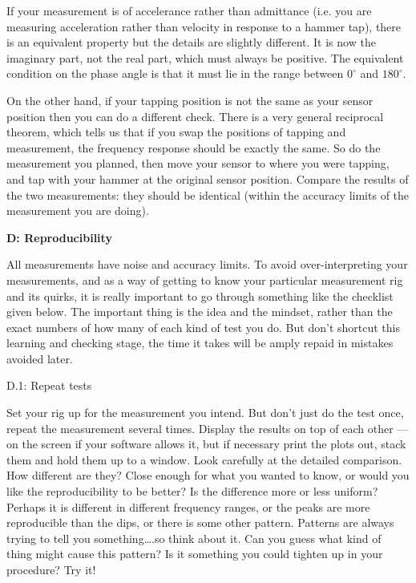   If your measurement is of accelerance rather than admittance (i.e. you are 
  measuring acceleration rather than velocity in response to a hammer tap), 
  there is an equivalent property but the details are slightly different. It is 
  now the imaginary part, not the real part, which must always be positive. The 
  equivalent condition on the phase angle is that it must lie in the range 
  between $0^\circ$ and $180^\circ$. 

  On the other hand, if your tapping position is not the same as your sensor 
  position then you can do a different check. There is a very general 
  reciprocal theorem, which tells us that if you swap the positions of tapping 
  and measurement, the frequency response should be exactly the same. So do the 
  measurement you planned, then move your sensor to where you were tapping, and 
  tap with your hammer at the original sensor position. Compare the results of 
  the two measurements: they should be identical (within the accuracy limits of 
  the measurement you are doing). 

  \textbf{D: Reproducibility} 

  All measurements have noise and accuracy limits. To avoid over-interpreting 
  your measurements, and as a way of getting to know your particular 
  measurement rig and its quirks, it is really important to go through 
  something like the checklist given below. The important thing is the idea and 
  the mindset, rather than the exact numbers of how many of each kind of test 
  you do. But don’t shortcut this learning and checking stage, the time it 
  takes will be amply repaid in mistakes avoided later. 

  D.1: Repeat tests 

  Set your rig up for the measurement you intend. But don’t just do the test 
  once, repeat the measurement several times. Display the results on top of 
  each other — on the screen if your software allows it, but if necessary print 
  the plots out, stack them and hold them up to a window. Look carefully at the 
  detailed comparison. How different are they? Close enough for what you wanted 
  to know, or would you like the reproducibility to be better? Is the 
  difference more or less uniform? Perhaps it is different in different 
  frequency ranges, or the peaks are more reproducible than the dips, or there 
  is some other pattern. Patterns are always trying to tell you something….so 
  think about it. Can you guess what kind of thing might cause this pattern? Is 
  it something you could tighten up in your procedure? Try it! 

